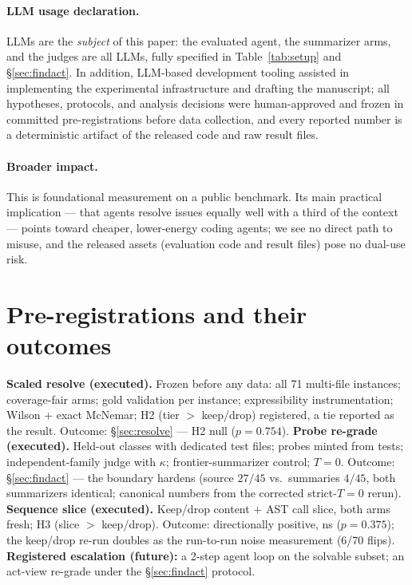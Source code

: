\documentclass{article}
\begin{document}
\paragraph{LLM usage declaration.} LLMs are the \emph{subject} of this paper: the evaluated agent,
the summarizer arms, and the judges are all LLMs, fully specified in Table~\ref{tab:setup} and
\S\ref{sec:findact}. In addition, LLM-based development tooling assisted in implementing the
experimental infrastructure and drafting the manuscript; all hypotheses, protocols, and analysis
decisions were human-approved and frozen in committed pre-registrations before data collection,
and every reported number is a deterministic artifact of the released code and raw result files.

\paragraph{Broader impact.} This is foundational measurement on a public benchmark. Its main
practical implication --- that agents resolve issues equally well with a third of the context ---
points toward cheaper, lower-energy coding agents; we see no direct path to misuse, and the
released assets (evaluation code and result files) pose no dual-use risk.

\section{Pre-registrations and their outcomes}
\label{app:prereg}

\textbf{Scaled resolve (executed).} Frozen before any data: all 71 multi-file instances;
coverage-fair arms; gold validation per instance; expressibility instrumentation; Wilson +
exact McNemar; H2 (tier $>$ keep/drop) registered, a tie reported as the result. Outcome:
\S\ref{sec:resolve} --- H2 null ($p{=}0.754$).
\textbf{Probe re-grade (executed).} Held-out classes with dedicated test files; probes minted from
tests; independent-family judge with $\kappa$; frontier-summarizer control; $T{=}0$. Outcome:
\S\ref{sec:findact} --- the boundary hardens (source $27/45$ vs.\ summaries $4/45$, both
summarizers identical; canonical numbers from the corrected strict-$T{=}0$ rerun).
\textbf{Sequence slice (executed).} Keep/drop content $+$ AST call slice, both arms fresh;
H3 (slice $>$ keep/drop). Outcome: directionally positive, ns ($p{=}0.375$); the keep/drop re-run
doubles as the run-to-run noise measurement (6/70 flips).
\textbf{Registered escalation (future):} a 2-step agent loop on the solvable subset; an act-view
re-grade under the \S\ref{sec:findact} protocol.
\end{document}
